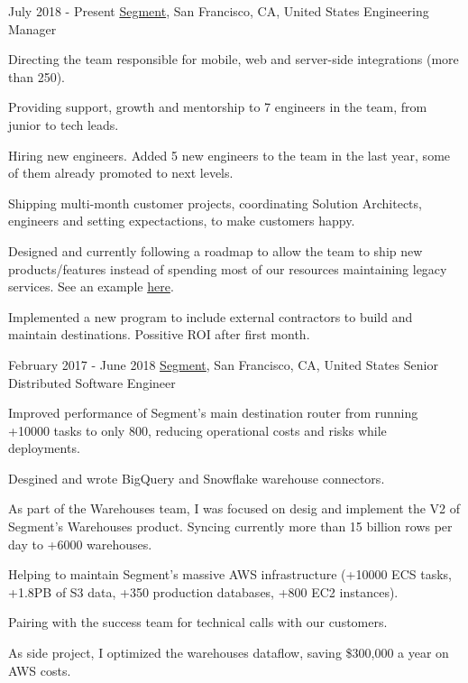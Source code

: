
\experience
  {July 2018 - Present}
  {\href{https://segment.com}{Segment}, San Francisco, CA, United States}
  {Engineering Manager}
  {\vspace{-1em}\begin{rlist}
    \item Directing the team responsible for mobile, web and server-side integrations (more than 250).
    \item Providing support, growth and mentorship to 7 engineers in the team, from junior to tech leads.
    \item Hiring new engineers. Added 5 new engineers to the team in the last year, some of them already promoted to next levels.
    \item Shipping multi-month customer projects, coordinating Solution Architects, engineers and setting expectactions, to make customers happy.
    \item Designed and currently following a roadmap to allow the team to ship new products/features instead of spending most 
    of our resources maintaining legacy services. See an example \href{https://segment.com/blog/unleashing-the-power-of-raw-data-with-amazon-lambda/}{here}.
    \item Implemented a new program to include external contractors to build and maintain destinations. Possitive ROI after first month.
  \end{rlist}}
  
\experience
  {February 2017 - June 2018}
  {\href{https://segment.com}{Segment}, San Francisco, CA, United States}
  {Senior Distributed Software Engineer}
  {\vspace{-1em}\begin{rlist}
    \item Improved performance of Segment's main destination router from running +10000 tasks to only 800, reducing operational
    costs and risks while deployments.
    \item Desgined and wrote BigQuery and Snowflake warehouse connectors.
    \item As part of the Warehouses team, I was focused on desig and implement the V2 of Segment's Warehouses 
    product. Syncing currently more than 15 billion rows per day to +6000 warehouses.
    \item Helping to maintain Segment's massive AWS infrastructure (+10000 ECS tasks, +1.8PB of S3 data,
    +350 production databases, +800 EC2 instances).
    \item Pairing with the success team for technical calls with our customers. 
    \item As side project, I optimized the warehouses dataflow, saving \$300,000 a year on AWS costs.
  \end{rlist}}

